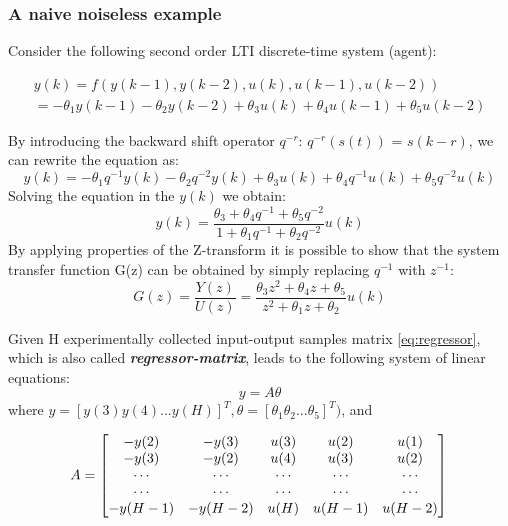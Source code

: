 \subsubsection{A naive noiseless example}

Consider the following second order LTI discrete-time system (agent):

\begin{equation}
\begin{array}{l}
y(k) = f(y(k - 1), y(k - 2), u(k), u(k - 1), u(k - 2)) \\[1ex]
= -\theta_1 y(k - 1) - \theta_2 y(k - 2) + \theta_3 u(k) + \theta_4 u(k - 1) + \theta_5 u(k - 2)
\end{array}
\end{equation}

By introducing the backward shift operator \(q^{−r}\): \(q^{−r}(s(t))\)  = \(s(k − r)\), we can
rewrite the equation as:
\begin{equation}
y(k) = -\theta_1 q^{-1} y(k) - \theta_2 q^{-2} y(k) + \theta_3 u(k) + \theta_4 q^{-1} u(k) + \theta_5 q^{-2} u(k)
\end{equation}
Solving the equation in the \(y(k)\) we obtain:\\
\begin{equation}
y(k) = \frac{\theta_3 + \theta_4 q^{-1} + \theta_5 q^{-2}}{1 + \theta_1 q^{-1} + \theta_2 q^{-2}} u(k)
\end{equation}
By applying properties of the Z-transform it is possible to show that the system
transfer function G(z) can be obtained by simply replacing \(q^{-1}\) with \(z^{-1}\):
\begin{equation}
G(z) = \frac{Y(z)}{U(z)} = \frac{\theta_3 z^2 + \theta_4 z + \theta_5}{z^2 + \theta_1 z + \theta_2} u(k)
\end{equation}

Given H experimentally collected input-output samples matrix \ref{eq:regressor}, which is also called \textbf{\textit{regressor-matrix}}, leads to the following system of linear equations:
\begin{equation}
    y = A\theta
\end{equation}
where \(y = [y(3) y(4) ... y(H)]^T, \theta = [\theta_1 \theta_2 ... \theta_5]^T)\), and

\begin{equation}
    A = \left[
    \begin{matrix}
    -y(2) & -y(3) & u(3) & u(2) & u(1) \\
    -y(3) & -y(2) & u(4) & u(3) & u(2) \\
    \cdots & \cdots & \cdots & \cdots & \cdots   \\
    \cdots & \cdots & \cdots & \cdots & \cdots   \\
    -y(H-1) & -y(H-2) & u(H) & u(H-1) & u(H-2)
    \end{matrix} 
    \right]\\
\end{equation}

